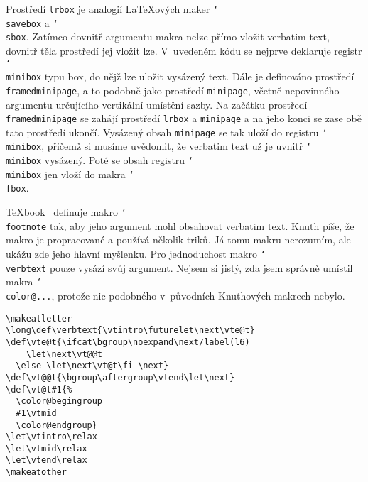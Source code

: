 \documentclass[oldcsbabel]{csbulletin}
\def\p#1{\texttt{\char`\\#1}}
\begin{document}
\medskip

Prostředí \texttt{lrbox} je analogií \LaTeX ových maker \p{savebox} a \p{sbox}. Zatímco dovnitř argumentu makra nelze přímo vložit verbatim text, dovnitř těla prostředí jej vložit lze. V~uvedeném kódu se nejprve deklaruje registr \p{minibox} typu box, do nějž lze uložit vysázený text. Dále je definováno prostředí \texttt{framedminipage}, a to podobně jako prostředí \texttt{minipage}, včetně nepovinného argumentu určujícího vertikální umístění sazby. Na začátku prostředí \texttt{framedminipage} se zahájí prostředí \texttt{lrbox} a \texttt{minipage} a na jeho konci se zase obě tato prostředí ukončí. Vysázený obsah \texttt{minipage} se tak uloží do registru \p{minibox}, přičemž si musíme uvědomit, že verbatim text už je uvnitř \p{minibox} vysázený. Poté se obsah registru \p{minibox} jen vloží do makra \p{fbox}.

\TeX book~\cite[str.~363]{tb} definuje makro \p{footnote} tak, aby jeho argument mohl obsahovat verbatim text. Knuth píše, že makro je propracované a používá několik triků. Já tomu makru nerozumím, ale ukážu zde jeho hlavní myšlenku. Pro jednoduchost makro \p{verbtext} pouze vysází svůj argument. Nejsem si jistý, zda jsem správně umístil makra \p{color@...}, protože nic podobného v~původních Knuthových makrech nebylo.

\makeatletter
\long\def\verbtext{\vtintro\futurelet\next\vte@t}
\def\vte@t{\ifcat\bgroup\noexpand\next
    \let\next\vt@@t
  \else \let\next\vt@t\fi \next}
\def\vt@@t{\bgroup\aftergroup\vtend\let\next}
\def\vt@t#1{%
  \color@begingroup
  #1\vtmid
  \color@endgroup}
\let\vtintro\relax
\let\vtmid\relax
\let\vtend\relax
\makeatother

\begin{Verbatim}[commandchars=/()]
\makeatletter
\long\def\verbtext{\vtintro\futurelet\next\vte@t}
\def\vte@t{\ifcat\bgroup\noexpand\next/label(l6)
    \let\next\vt@@t
  \else \let\next\vt@t\fi \next}
\def\vt@@t{\bgroup\aftergroup\vtend\let\next}
\def\vt@t#1{%
  \color@begingroup
  #1\vtmid
  \color@endgroup}
\let\vtintro\relax
\let\vtmid\relax
\let\vtend\relax
\makeatother
\end{Verbatim}
\end{document}
